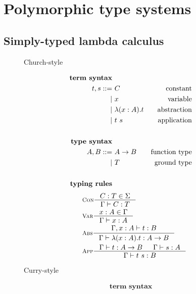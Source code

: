 \chapter{Polymorphic type systems}\label{ch:poly}

\section{Simply-typed lambda calculus}
\begin{figure}
\begin{singlespace}
\begin{minipage}{.46\textwidth}
	\begin{center}Church-style\end{center}
\def\baselinestretch{0}
\small
\begin{align*}
\textbf{term syntax} \\
t,s ::= &~ C           & \text{constant}    \\
      | &~ x           & \text{variable}    \\
      | &~ \lambda(x:A) . t & \text{abstraction} \\
      | &~ t ~ s       & \text{application} \\
\\
\textbf{type syntax} \\
A,B ::= &~ A -> B  & \text{function type} \\
      | &~ T       & \text{ground type}   \\
\\
\textbf{typing rules}
\end{align*}
\vspace*{-1.5em}
\begin{align*}\quad
& \inference[\sc Con]{C:T \in \Sigma}{\Gamma |- C:T} \\
& \inference[\sc Var]{x:A \in \Gamma}{\Gamma |- x:A} \\
& \inference[\sc Abs]{\Gamma,x:A |- t : B}{\Gamma |- \lambda(x:A).t : A -> B} \\
& \inference[\sc App]{\Gamma |- t : A -> B & \Gamma |- s : A}{\Gamma |- t~s : B}
\end{align*}
\end{minipage}
\begin{minipage}{.46\textwidth}
	\begin{center}Curry-style\end{center}
\def\baselinestretch{0}
\small
\begin{align*}
\textbf{term syntax} \\

\end{align*}
\end{minipage}
\end{singlespace}
\end{figure}
